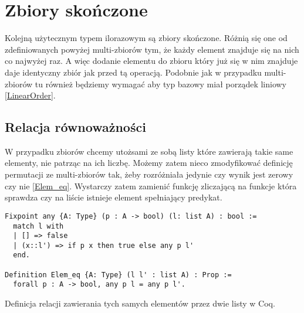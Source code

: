 \section{Zbiory skończone}
Kolejną użytecznym typem ilorazowym są zbiory skończone. Różnią się one od zdefiniowanych powyżej multi-zbiorów tym, że każdy element znajduje się na nich co najwyżej raz. A więc dodanie elementu do zbioru który już się w nim znajduje daje identyczny zbiór jak przed tą operacją. Podobnie jak w przypadku multi-zbiorów tu również będziemy wymagać aby typ bazowy miał porządek liniowy \ref{LinearOrder}. 
\subsection{Relacja równoważności}
W przypadku zbiorów chcemy utożsami ze sobą listy które zawierają takie same elementy, nie patrząc na ich liczbę. Możemy zatem nieco zmodyfikować definicję permutacji ze multi-zbiorów tak, żeby rozróżniała jedynie czy wynik jest zerowy czy nie \ref{Elem_eq}. Wystarczy zatem zamienić funkcję zliczającą na funkcje która sprawdza czy na liście istnieje element spełniający predykat.
\begin{code}
\begin{verbatim}
Fixpoint any {A: Type} (p : A -> bool) (l: list A) : bool :=
  match l with
  | [] => false
  | (x::l') => if p x then true else any p l'
  end.

Definition Elem_eq {A: Type} (l l' : list A) : Prop := 
  forall p : A -> bool, any p l = any p l'.
\end{verbatim}
\caption{Definicja relacji zawierania tych samych elementów przez dwie listy w Coq.}
\label{Elem_eq}
\end{code}
